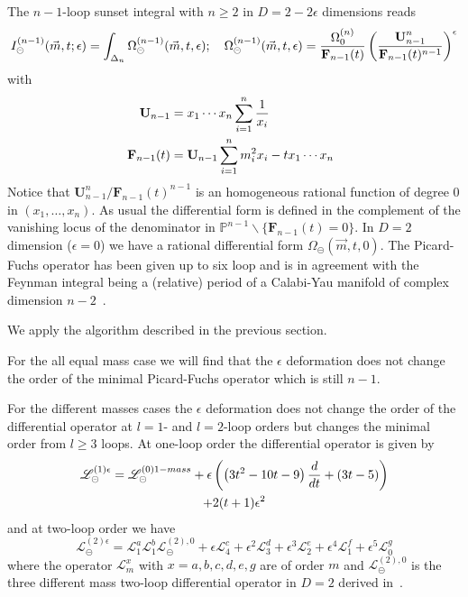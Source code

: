 \documentclass[a4paper,12pt]{article}
\numberwithin{equation}{section}
\numberwithin{figure}{subsection}
\theoremstyle{plain}
\theoremstyle{plain}
\theoremstyle{definition}
\theoremstyle{plain}
\theoremstyle{remark}
\theoremstyle{plain}
\def\su{\circleddash}
\begin{document}
The $n-1$-loop sunset integral with $n\geq2$ in $D=2-2\epsilon$ dimensions reads
\begin{equation}
  I^{(n-1)}_\su(\vec m,t;\epsilon)= \int_{\Delta_n} \Omega^{(n-1)}_\su(\vec m,t,\epsilon)  ; \quad
  \Omega^{(n-1)}_\su(\vec m, t,\epsilon)={\Omega^{(n)}_0\over
    \textbf{F}_{n-1}(t)}\left(\textbf{U}_{n-1}^n\over \textbf{F}_{n-1}(t)^{n-1}\right)^\epsilon
\end{equation}
with
\begin{align}
  \textbf{ U}_{n-1}&= x_1\cdots x_n\sum_{i=1}^n {1\over x_i} \cr
      \textbf{   F}_{n-1}(t)&= \textbf{U}_{n-1} \sum_{i=1}^n m_i^2x_i-t x_1\cdots x_n
\end{align}
Notice that $\textbf{U}_{n-1}^n/ \textbf{F}_{n-1}(t)^{n-1}$ is an homogeneous
rational function  of degree
0 in $(x_1,\dots,x_n)$. As usual the differential form is defined in
the complement of the vanishing locus of the denominator in $\mathbb P^{n-1}\backslash\{\textbf{F}_{n-1}(t)=0\}$.
In $D=2$ dimension ($\epsilon=0$) we have a rational  differential form
$\Omega_\su(\vec m,t,0)$. The Picard-Fuchs operator has been
given up to six loop and is in agreement with the Feynman integral
being a (relative) period of a Calabi-Yau  manifold of complex dimension $n-2$~\cite{Bloch:2013tra,Bloch:2014qca,Bloch:2014qca,Bourjaily:2019hmc,Bonisch:2020qmm,Bonisch:2021yfw,Candelas:2021lkc,Forum:2022lpz}.

We apply the algorithm described in the previous section.


For the all equal mass case we will find that the $\epsilon$
deformation does not change the order of the minimal Picard-Fuchs
operator which is still $n-1$.

For the different masses cases the $\epsilon$ deformation does not
change the order of the differential operator at $l=1$- and $l=2$-loop
orders but changes the minimal order from  $l\geq3$ loops.
At one-loop order the differential operator is given by
\begin{multline}
    \mathscr{L}_\su^{(1)\epsilon} =
    \mathscr{L}_\su^{(0)1-mass}  + \epsilon 
    \left(\left(3 t^2-10
        t-9\right) {d\over dt}+(3t-5)\right)\cr +2 (t+1)
    \epsilon ^2
  \end{multline}
  and at two-loop order we have
  \begin{equation}
     \mathscr{L}^{(2)\epsilon}_\su =   \mathscr{L}^{a}_1
     \mathscr{L}^{b}_1    \mathscr{L}^{(2),0}_\su +\epsilon
     \mathscr{L}^{c}_4+\epsilon^2  \mathscr{L}^{d}_3+\epsilon^3
     \mathscr{L}^{e}_2+ \epsilon^4 \mathscr{L}^{f}_1 +\epsilon^5
   \mathscr{L}^{g}_0
   \end{equation} 
   where the operator $ \mathscr{L}^{x}_m$  with $x=a,b,c,d,e,g$ are
   of order $m$  and $ \mathscr{L}^{(2),0}_\su $ is the three
   different mass two-loop differential operator in $D=2$ derived in~\cite{Remiddi:2016gno,Bloch:2016izu,Muller-Stach:2011qkg}.
  
\end{document}
